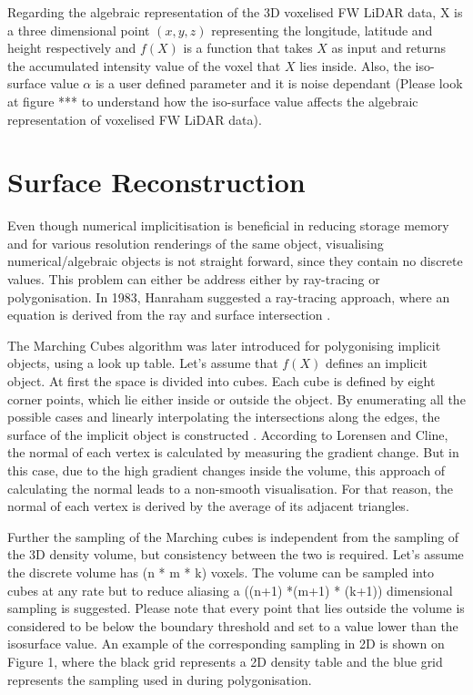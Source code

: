 \documentclass{subfiles}
\begin{document}
\par Regarding the algebraic representation of the 3D voxelised FW LiDAR data, X is a three dimensional point $\mathit{(x, y, z) }$ representing the longitude, latitude and height respectively and ${f(X)}$ is a function that takes  $\mathit{X}$ as input and returns the accumulated intensity value of the voxel that  $\mathit{X}$ lies inside. Also, the iso-surface value $\mathit{\alpha }$ is a user defined parameter and it is noise dependant (Please look at figure *** to understand how the iso-surface value affects the algebraic representation of voxelised FW LiDAR data). 




\section {Surface Reconstruction}\label{sec:SurfaceReconstruction}
\par Even though numerical implicitisation is beneficial in reducing storage memory and for various resolution renderings of the same object, visualising numerical/algebraic objects is not straight forward, since they contain no discrete values. This problem can either be address either by ray-tracing or polygonisation. In 1983, Hanraham suggested a ray-tracing approach, where an equation is derived from the ray and surface intersection \cite{Hanrahan1983}.  

\par The Marching Cubes algorithm was later introduced for polygonising implicit objects, using a look up table. Let’s assume that $f(X)$ defines an implicit object. At first the space is divided into cubes. Each cube is defined by eight corner points, which lie either inside or outside the object. By enumerating all the possible cases and linearly interpolating the intersections along the edges, the surface of the implicit object is constructed \cite{Lorensen1987}. According to Lorensen and Cline, the normal of each vertex is calculated by measuring the gradient change. But in this case, due to the high gradient changes inside the volume, this approach of calculating the normal leads to a non-smooth visualisation. For that reason, the normal of each vertex is derived by the average of its adjacent triangles. 

\par Further the sampling of the Marching cubes is independent from the sampling of the 3D density volume, but consistency between the two is required. Let’s assume the discrete volume has (n * m * k) voxels. The volume can be sampled into cubes at any rate but to reduce aliasing a ((n+1) *(m+1) * (k+1)) dimensional sampling is suggested. Please note that every point that lies outside the volume is considered to be below the boundary threshold and set to a value lower than the isosurface value. An example of the corresponding sampling in 2D is shown on Figure 1, where the black grid represents a 2D density table and the blue grid represents the sampling used in during polygonisation.
\end{document}
